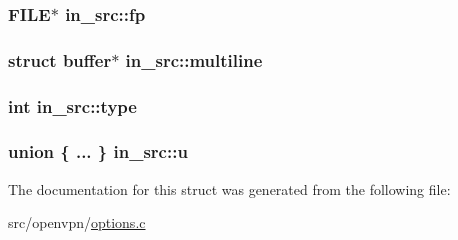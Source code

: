 \subsubsection[{fp}]{\setlength{\rightskip}{0pt plus 5cm}F\+I\+L\+E$\ast$ in\+\_\+src\+::fp}\label{structin__src_a625b87c8bb54789f2499a91ca733be4f}
\hypertarget{structin__src_a5099532957aa1b36cd335e660b40bd49}{}
\subsubsection[{multiline}]{\setlength{\rightskip}{0pt plus 5cm}struct {\bf buffer}$\ast$ in\+\_\+src\+::multiline}\label{structin__src_a5099532957aa1b36cd335e660b40bd49}
\hypertarget{structin__src_a8e338b762bd66893ba05ebbf002c6d6f}{}
\subsubsection[{type}]{\setlength{\rightskip}{0pt plus 5cm}int in\+\_\+src\+::type}\label{structin__src_a8e338b762bd66893ba05ebbf002c6d6f}
\hypertarget{structin__src_a98eb3d3e648b98b8b202f30baddef04a}{}
\subsubsection[{u}]{\setlength{\rightskip}{0pt plus 5cm}union \{ ... \}   in\+\_\+src\+::u}\label{structin__src_a98eb3d3e648b98b8b202f30baddef04a}


The documentation for this struct was generated from the following file\+:\begin{DoxyCompactItemize}
\item 
src/openvpn/\hyperlink{options_8c}{options.\+c}\end{DoxyCompactItemize}
